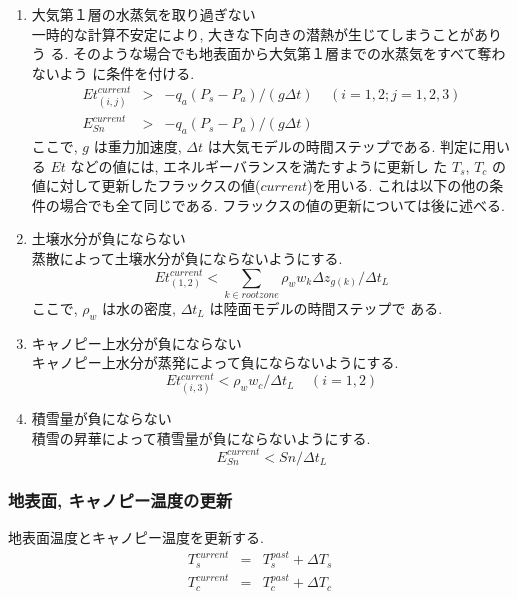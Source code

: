 \begin{enumerate}
 \item 大気第１層の水蒸気を取り過ぎない \\
 一時的な計算不安定により, 大きな下向きの潜熱が生じてしまうことがありう
 る.
 そのような場合でも地表面から大気第１層までの水蒸気をすべて奪わないよう
 に条件を付ける.
 \begin{eqnarray}
  Et_{(i,j)}^{current} &>& - q_a ( P_s - P_a ) / (g \Delta t)
   \ \ \ \ \ (i=1,2 ; j=1,2,3) \\
  E_{Sn}^{current} &>& - q_a ( P_s - P_a ) / (g \Delta t)
 \end{eqnarray}
  ここで, $g$ は重力加速度, $\Delta t$ は大気モデルの時間ステップである.
  判定に用いる $Et$ などの値には, エネルギーバランスを満たすように更新し
  た $T_s$, $T_c$ の値に対して更新したフラックスの値($current$)を用いる.
  これは以下の他の条件の場合でも全て同じである.
  フラックスの値の更新については後に述べる.
 \item 土壌水分が負にならない \\
  蒸散によって土壌水分が負にならないようにする.
  \begin{equation}
   Et_{(1,2)}^{current} <
     \sum_{k\in rootzone} \rho_w w_{k}\Delta z_{g(k)} /\Delta t_L
  \end{equation}
  ここで, $\rho_w$ は水の密度, $\Delta t_L$ は陸面モデルの時間ステップで
  ある.
 \item キャノピー上水分が負にならない \\
  キャノピー上水分が蒸発によって負にならないようにする.
  \begin{equation}
   Et_{(i,3)}^{current} < \rho_w w_c /\Delta t_L
   \ \ \ \ \ (i=1,2)
  \end{equation}
 \item 積雪量が負にならない \\
  積雪の昇華によって積雪量が負にならないようにする.
  \begin{equation}
   E_{Sn}^{current} < Sn /\Delta t_L
  \end{equation}
\end{enumerate}

\subsubsection{地表面, キャノピー温度の更新}

  地表面温度とキャノピー温度を更新する.
\begin{eqnarray}
 T_s^{current} &=& T_s^{past} + \Delta T_s \\
 T_c^{current} &=& T_c^{past} + \Delta T_c
\end{eqnarray}

